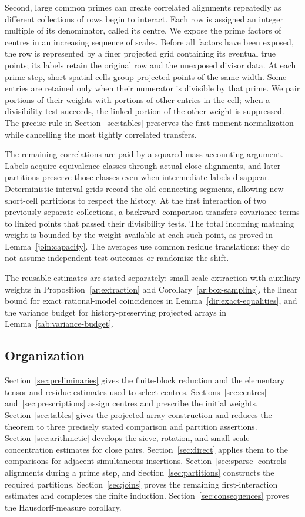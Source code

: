 Second, large common primes can create correlated alignments repeatedly
as different collections of rows begin to interact. Each row is assigned
an integer multiple of its denominator, called its centre. We expose the
prime factors of centres in an increasing sequence of scales. Before all factors have
been exposed, the row is represented by a finer projected grid containing
its eventual true points; its labels retain the original row and the
unexposed divisor data. At each prime step, short spatial cells group
projected points of the same width. Some entries are retained only when
their numerator is divisible by that prime. We pair portions of their
weights with portions of other entries in the cell; when a divisibility
test succeeds, the linked portion of the other weight is suppressed.
The precise rule in Section~\ref{sec:tables} preserves the first-moment
normalization while cancelling the most tightly correlated transfers.

The remaining correlations are paid by a squared-mass accounting
argument. Labels acquire equivalence classes through actual close
alignments, and later partitions preserve those classes even when
intermediate labels disappear. Deterministic interval grids record the
old connecting segments, allowing new short-cell partitions to respect the
history. At the first interaction of two previously separate collections,
a backward comparison transfers covariance terms to linked points that
passed their divisibility tests. The total incoming matching weight is
bounded by the weight available at each such point, as proved in
Lemma~\ref{join:capacity}. The averages use common residue translations;
they do not assume independent test outcomes or randomize the shift.

The reusable estimates are stated separately: small-scale extraction
with auxiliary weights in Proposition~\ref{ar:extraction} and
Corollary~\ref{ar:box-sampling}, the linear bound for exact rational-model
coincidences in Lemma~\ref{dir:exact-equalities}, and the variance budget
for history-preserving projected arrays in Lemma~\ref{tab:variance-budget}.

\subsection{Organization}

Section~\ref{sec:preliminaries} gives the finite-block reduction and
the elementary tensor and residue estimates used to select centres.
Sections~\ref{sec:centres}
and~\ref{sec:prescriptions} assign centres and prescribe the initial
weights. Section~\ref{sec:tables} gives the projected-array construction
and reduces the theorem to three precisely stated comparison and
partition assertions. Section~\ref{sec:arithmetic} develops the
sieve, rotation, and small-scale concentration estimates for close pairs.
Section~\ref{sec:direct} applies them to the comparisons
for adjacent simultaneous insertions. Section~\ref{sec:sparse} controls alignments
during a prime step, and Section~\ref{sec:partitions} constructs the
required partitions. Section~\ref{sec:joins} proves the remaining
first-interaction estimates and completes the finite induction.
Section~\ref{sec:consequences} proves the Hausdorff-measure corollary.
